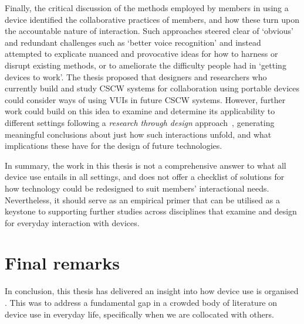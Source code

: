 \begin{revisedsubmission}
Finally, the critical discussion of the methods employed by members in using a device identified the collaborative practices of members, and how these turn upon the accountable nature of interaction.
Such approaches steered clear of `obvious' and redundant challenges such as `better voice recognition' and instead attempted to explicate nuanced and provocative ideas for how to harness or disrupt existing methods, or to ameliorate the difficulty people had in `getting devices to work'.
The thesis proposed that designers and researchers who currently build and study \ac{CSCW} systems for collaboration using portable devices could consider ways of using \acp{VUI} in future \ac{CSCW} systems.
However, further work could build on this idea to examine and determine its applicability to different settings following a \textit{research through design} approach~\citep{Zimmerman2007a}, generating meaningful conclusions about just how such interactions unfold, and what implications these have for the design of future technologies.

In summary, the work in this thesis is not a comprehensive answer to what all device use entails in all settings, and does not offer a checklist of solutions for how technology could be redesigned to suit members' interactional needs.
Nevertheless, it should serve as an empirical primer that can be utilised as a keystone to supporting further studies across disciplines that examine and design for everyday interaction with devices.
\end{revisedsubmission}






\section{Final remarks}\label{sec:synopsis conclusions final}
In conclusion, this thesis has delivered an  insight into  how device use is  organised .
This was to address a fundamental gap in a crowded body of literature on device use in everyday life,  specifically when we are collocated with others.




